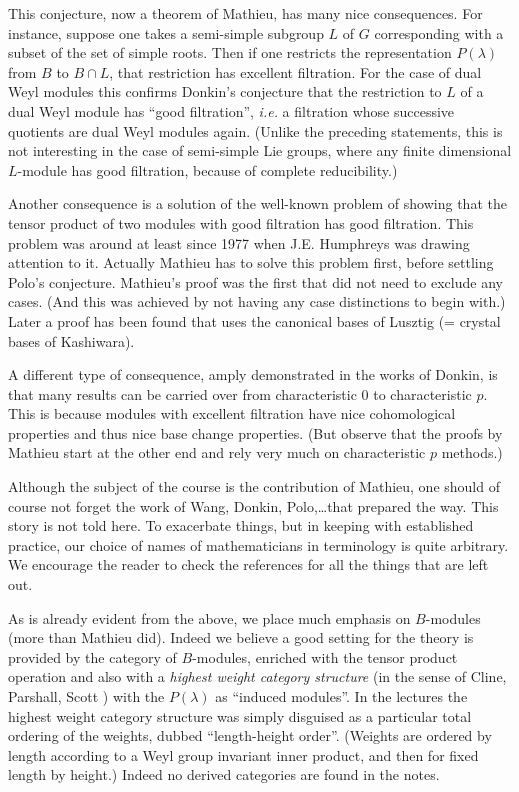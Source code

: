 This conjecture, now a theorem of Mathieu, has many nice
consequences. For instance, suppose one takes a semi-simple subgroup
$L$ of $G$ corresponding with a subset of the set of simple
roots. Then if one restricts the representation $P(\lambda)$ from $B$
to $B\cap L$, that restriction has excellent filtration. For the case
of dual Weyl modules this confirms Donkin's conjecture that the
restriction to $L$ of a dual Weyl module has ``good filtration'', {\em
  i.e.} a filtration whose successive quotients are dual Weyl modules
again. (Unlike the preceding statements, this is not interesting in
the case of semi-simple Lie groups, where any finite dimensional
$L$-module has good filtration, because of complete reducibility.)

Another consequence is a solution of the well-known problem of showing
that the tensor product of two modules with good filtration has good
filtration. This problem was around at least since 1977 when J.E.\@
Humphreys was drawing attention to it. Actually Mathieu has to solve
this problem first, before settling Polo's conjecture. Mathieu's proof
was the first that did not need to exclude any cases. (And this was
achieved by not having any case distinctions to begin with.) Later a
proof has been found that uses the canonical bases of Lusztig (=
crystal bases of Kashiwara).

A different type of consequence, amply demonstrated in the works of
Donkin, is that many results can be carried over from characteristic
$0$ to characteristic $p$. This is because modules with excellent
filtration have nice cohomological properties and thus nice base
change properties. (But observe that the proofs by Mathieu start at
the other end and rely very much on characteristic $p$ methods.)

Although the subject of the course is the contribution of Mathieu, one
should of course not forget the work of Wang, Donkin, Polo,\ldots that
prepared the way. This story is not told here. To exacerbate things,
but in keeping with established practice, our choice of names of
mathematicians in terminology is quite arbitrary. We encourage the
reader to check the references for all the things that are left out.

As is already evident from the above, we place much emphasis on
$B$-modules (more than Mathieu did). Indeed we believe a good setting
for the theory is provided by the category of $B$-modules, enriched
with the tensor product operation and also with a {\em highest weight
  category structure} (in the sense of Cline, Parshall, Scott
\cite{key2}) with the $P(\lambda)$ as ``induced modules''. In the
lectures the highest weight category structure was simply disguised as
a particular total ordering of the weights, dubbed ``length-height
order''. (Weights are ordered by length according to a Weyl group
invariant inner product, and then for fixed length by height.) Indeed
no derived categories are found in the notes.

